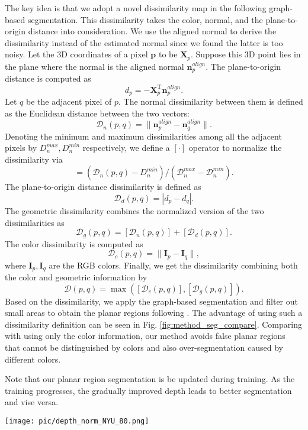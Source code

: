 \documentclass[10pt,twocolumn,letterpaper]{article}
\newcommand{\vts}{\mathrm{T}}
\newcommand{\bv}[1]{{\bm {#1}}}
\newcommand{\beq}{\begin{equation}}
\newcommand{\eeq}{\end{equation}}
\newcommand{\Fig}[1]{Fig. \ref{#1}}
\newcommand{\Tab}[1]{Tab. \ref{#1}}
\begin{document}
The key idea is that we adopt a novel dissimilarity map in the following graph-based segmentation. This dissimilarity takes the color, normal, and the plane-to-origin distance into consideration.  We use the aligned normal to derive the dissimilarity instead of the estimated normal since we found the latter is too noisy.
Let the 3D coordinates of a pixel $\bv{p}$ to be $\bv{X}_p$. Suppose this 3D point lies in the plane where the normal is the aligned normal $\bv{n}^{align}_p$. The plane-to-origin distance is computed as 
\beq
d_p =  -\bv{X}_p^\vts\bv{n}^{align}_p.
\eeq
Let $q$ be the adjacent pixel of $p$. The normal dissimilarity between them is defined as the Euclidean distance between the two vectors:
\beq
\mathcal{D}_n(p,q) = \|\bv{n}^{align}_p - \bv{n}^{align}_q\|.
\eeq
Denoting the minimum and maximum dissimilarities among all the adjacent pixels by $D_n^{max}, D_n^{min}$ respectively, we define a $[\cdot]$ operator to normalize the dissimilarity via
\beq
[\mathcal{D}_n(p,q)] = (\mathcal{D}_n(p,q)- D_n^{min})/(\mathcal{D}_n^{max}-\mathcal{D}_n^{min}).
\eeq
The plane-to-origin distance dissimilarity is defined as
\beq
\mathcal{D}_d(p,q) = |d_p - d_q|.
\eeq
The geometric dissimilarity combines the normalized version of the two dissimilarities as 
\beq
\mathcal{D}_g(p,q) = [\mathcal{D}_n(p,q)] +[\mathcal{D}_d(p,q)]. 
\eeq
The color dissimilarity is computed as
\beq
\mathcal{D}_c(p,q) = \|\bv{I}_p - \bv{I}_q\|,
\eeq
where $\bv{I}_p,\bv{I}_q$ are the RGB colors.
Finally, we get the dissimilarity combining both the color and geometric information by
\beq
\mathcal{D}(p,q)  = \max([\mathcal{D}_c(p,q)],[\mathcal{D}_g(p,q)]).
\eeq
Based on the dissimilarity, we apply the graph-based segmentation \cite{felzenszwalb2004efficient} and
filter out small areas to obtain the planar regions following \cite{yu2020p}. The advantage of using such a dissimilarity definition can be seen in \Fig{fig:method_seg_compare}. Comparing with using only the color information, our method avoids false planar regions that cannot be distinguished by colors and also over-segmentation caused by different colors.

Note that our planar region segmentation is be updated during training. As the training progresses, the gradually improved depth leads to better segmentation and vise versa.

\begin{figure*}[ht]
	\texttt{[image: pic/depth\_norm\_NYU\_80.png]}	\caption{Visualization of the NYUv2 results, better viewed by zooming on screen. The depth results are on the left columns, and the surface normal results are on the right columns. The results of Monodepth2\cite{godard2019digging}, P$^{2}$Net\cite{yu2020p}, and the ground-truth depth / normal are presented for comparison. Compared with P$^2$Net\cite{yu2020p} and Monodepth2\cite{godard2019digging}, our method obtains better surface normal and depth estimation as indicated by the red rectangles. Please refer to the \Tab{tab:nyuv2 depth} and \Tab{tab:nyuv2 norm} for the quantitative results.} 
	
	\label{Fig:norm results visualization}
\end{figure*}
\end{document}
